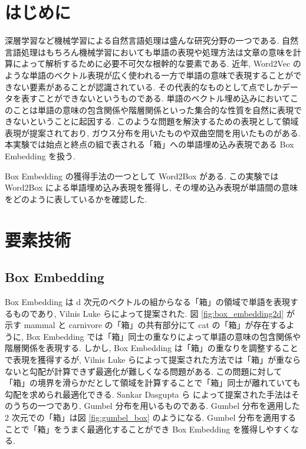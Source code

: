 \documentclass[twocolumn]{jarticle}     %
\begin{document}

\section{はじめに}
深層学習など機械学習による自然言語処理は盛んな研究分野の一つである. 
自然言語処理はもちろん機械学習においても単語の表現や処理方法は文章の意味を計算によって解析するために必要不可欠な根幹的な要素である.
近年, Word2Vec のような単語のベクトル表現が広く使われる一方で単語の意味で表現することができない要素があることが認識されている. 
その代表的なものとして点でしかデータを表すことができないというものである. 
単語のベクトル埋め込みにおいてこのことは単語の意味の包含関係や階層関係といった集合的な性質を自然に表現できないということに起因する. 
このような問題を解決するための表現として領域表現が提案されており, ガウス分布を用いたものや双曲空間を用いたものがある. 
本実験では始点と終点の組で表される「箱」への単語埋め込み表現である Box Embedding を扱う. 

Box Embedding の獲得手法の一つとして Word2Box がある. 
この実験では Word2Box による単語埋め込み表現を獲得し, その埋め込み表現が単語間の意味をどのように表しているかを確認した. 

\section{要素技術}
\subsection{Box Embedding}
Box Embedding は d 次元のベクトルの組からなる「箱」の領域で単語を表現するものであり, Vilnis Luke ら\cite{box-lattice}によって提案された. 
図 \ref{fig:box_embedding2d} が示す mammal と carnivore の「箱」の共有部分にて cat の「箱」が存在するように, Box Embedding では「箱」同士の重なりによって単語の意味の包含関係や階層関係を表現する. 
しかし, Box Embedding は「箱」の重なりを調整することで表現を獲得するが, Vilnis Luke らによって提案された方法では「箱」が重ならないと勾配が計算できず最適化が難しくなる問題がある.
この問題に対して「箱」の境界を滑らかだとして領域を計算することで「箱」同士が離れていても勾配を求められ最適化できる. 
Sankar Dasgupta ら \cite{gumbel-box} によって提案された手法はそのうちの一つであり, Gumbel 分布を用いるものである. 
Gumbel 分布を適用した 2 次元での「箱」は図 \ref{fig:gumbel_box} のようになる. 
Gumbel 分布を適用することで「箱」をうまく最適化することができ Box Embedding を獲得しやすくなる. 
\end{document}
